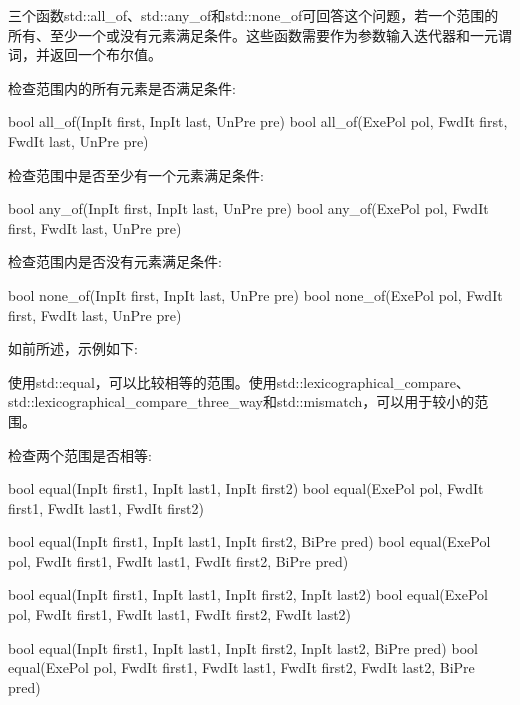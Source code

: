 
三个函数std::all\_of、std::any\_of和std::none\_of可回答这个问题，若一个范围的所有、至少一个或没有元素满足条件。这些函数需要作为参数输入迭代器和一元谓词，并返回一个布尔值。

检查范围内的所有元素是否满足条件:

\begin{cpp}
bool all_of(InpIt first, InpIt last, UnPre pre)
bool all_of(ExePol pol, FwdIt first, FwdIt last, UnPre pre)
\end{cpp}

检查范围中是否至少有一个元素满足条件:

\begin{cpp}
bool any_of(InpIt first, InpIt last, UnPre pre)
bool any_of(ExePol pol, FwdIt first, FwdIt last, UnPre pre)
\end{cpp}

检查范围内是否没有元素满足条件:

\begin{cpp}
bool none_of(InpIt first, InpIt last, UnPre pre)
bool none_of(ExePol pol, FwdIt first, FwdIt last, UnPre pre)
\end{cpp}

如前所述，示例如下:




使用std::equal，可以比较相等的范围。使用std::lexicographical\_compare、std::lexicographical\_compare\_three\_way和std::mismatch，可以用于较小的范围。

检查两个范围是否相等:

\begin{cpp}
bool equal(InpIt first1, InpIt last1, InpIt first2)
bool equal(ExePol pol, FwdIt first1, FwdIt last1, FwdIt first2)

bool equal(InpIt first1, InpIt last1, InpIt first2, BiPre pred)
bool equal(ExePol pol, FwdIt first1, FwdIt last1, FwdIt first2, BiPre pred)

bool equal(InpIt first1, InpIt last1,
		   InpIt first2, InpIt last2)
bool equal(ExePol pol, FwdIt first1, FwdIt last1,
		   FwdIt first2, FwdIt last2)
		   
bool equal(InpIt first1, InpIt last1,
		   InpIt first2, InpIt last2, BiPre pred)
bool equal(ExePol pol, FwdIt first1, FwdIt last1,
		   FwdIt first2, FwdIt last2, BiPre pred)
\end{cpp}

